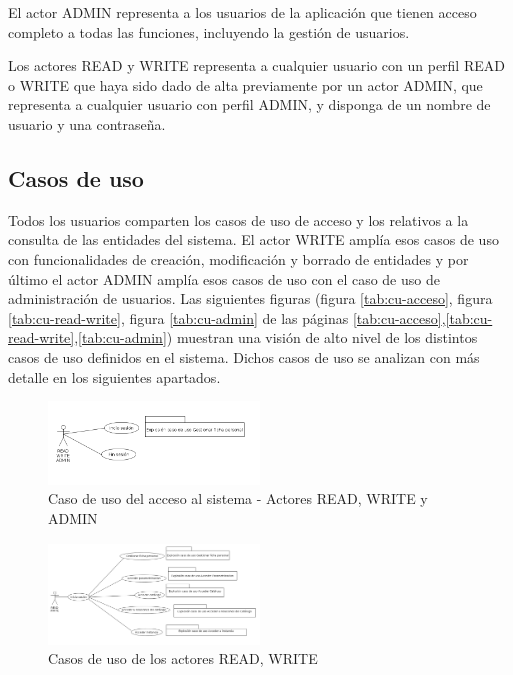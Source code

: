 El actor ADMIN representa a los usuarios de la aplicación que tienen
acceso completo a todas las funciones, incluyendo la gestión de usuarios.

Los actores  READ y  WRITE representa a cualquier usuario con un perfil READ o WRITE que haya sido dado de alta previamente por un actor ADMIN, que representa a cualquier usuario con perfil ADMIN, y disponga de un nombre de usuario y una contraseña.



\subsection{Casos de uso}
\label{sub:casos-uso}


Todos los usuarios comparten los casos de uso de acceso y los relativos a la consulta de las entidades del sistema. El actor WRITE amplía esos casos de uso con funcionalidades de creación, modificación y borrado de entidades y por último el actor ADMIN amplía esos casos de uso con el caso de uso de administración de usuarios. Las siguientes figuras (figura \ref{tab:cu-acceso}, figura \ref{tab:cu-read-write}, figura \ref{tab:cu-admin} de las páginas \ref{tab:cu-acceso},\ref{tab:cu-read-write},\ref{tab:cu-admin}) muestran una visión de alto nivel de los distintos casos de uso definidos en el sistema. Dichos casos de uso se analizan con más detalle en los siguientes apartados.


\begin{figure}[H]
  \centering
  \includegraphics[width=0.50\textwidth]{imaxes/cu_acceso.png}
  \caption{Caso de uso del acceso al sistema - Actores READ, WRITE y ADMIN}
  \label{fig:cu-acceso}
\end{figure}



\begin{figure}[H]
  \centering
  \includegraphics[width=0.50\textwidth]{imaxes/cu-read-write.png}
  \caption{Casos de uso de los actores READ, WRITE}
  \label{fig:cu-read-write}
\end{figure}



